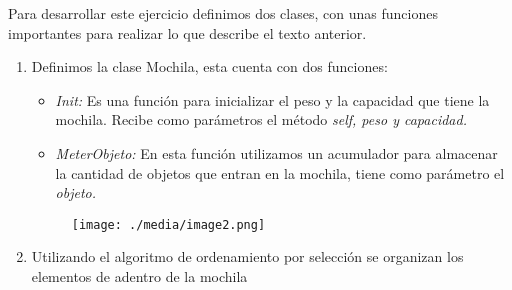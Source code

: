 \documentclass[12pt]{article}
\renewcommand{\_}{\kern-1.5pt\textunderscore\kern-1.5pt}
\begin{document}
Para desarrollar este ejercicio definimos dos clases, con unas funciones importantes para realizar lo que describe el texto anterior.\par

\begin{enumerate}
	\item Definimos la clase Mochila, esta cuenta con dos funciones:\par

\begin{itemize}
	\item \textit{Init:} Es una función para inicializar el peso y la capacidad que tiene la mochila. Recibe como parámetros el método \textit{self, peso y capacidad.}\par

	\item \textit{MeterObjeto: }En esta\textit{ }función utilizamos un acumulador para almacenar la cantidad de objetos que entran en la mochila, tiene como parámetro el \textit{objeto.}
\end{itemize}\par




\begin{figure}[H]
	\begin{Center}
		\texttt{[image: ./media/image2.png]}
	\end{Center}
\end{figure}



\par


\vspace{\baselineskip}

\vspace{\baselineskip}

\vspace{\baselineskip}

\vspace{\baselineskip}

\vspace{\baselineskip}

\vspace{\baselineskip}

\vspace{\baselineskip}

\vspace{\baselineskip}
	\item Utilizando el algoritmo de ordenamiento por selección se organizan los elementos de adentro de la mochila\par




\end{enumerate}
\end{document}
